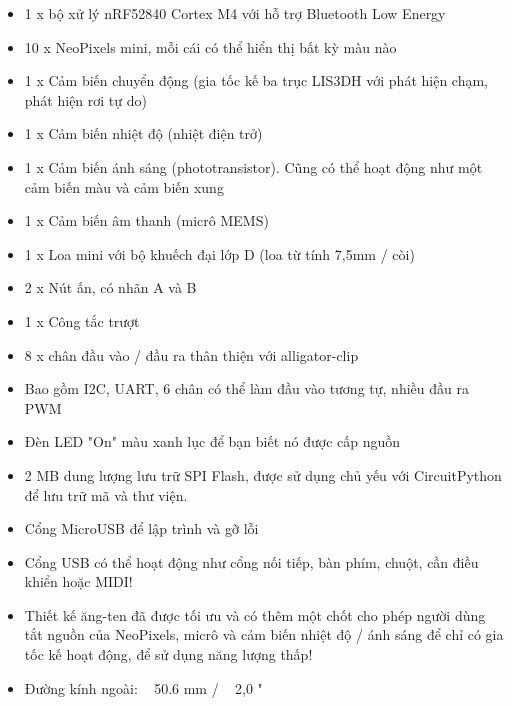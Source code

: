 \begin{itemize}
    \item 1 x bộ xử lý nRF52840 Cortex M4 với hỗ trợ Bluetooth Low Energy
    \item 10 x NeoPixels mini, mỗi cái có thể hiển thị bất kỳ màu nào
    \item 1 x Cảm biến chuyển động (gia tốc kế ba trục LIS3DH với phát hiện chạm, phát hiện rơi tự do)
    \item 1 x Cảm biến nhiệt độ (nhiệt điện trở)
    \item 1 x Cảm biến ánh sáng (phototransistor). Cũng có thể hoạt động như một cảm biến màu và cảm biến xung
    \item 1 x Cảm biến âm thanh (micrô MEMS)
    \item 1 x Loa mini với bộ khuếch đại lớp D (loa từ tính 7,5mm / còi)
    \item 2 x Nút ấn, có nhãn A và B
    \item 1 x Công tắc trượt
    \item 8 x chân đầu vào / đầu ra thân thiện với alligator-clip
    \item Bao gồm I2C, UART, 6 chân có thể làm đầu vào tương tự, nhiều đầu ra PWM
    \item Đèn LED "On" màu xanh lục để bạn biết nó được cấp nguồn
    \item 2 MB dung lượng lưu trữ SPI Flash, được sử dụng chủ yếu với CircuitPython để lưu trữ mã và thư viện.
    \item Cổng MicroUSB để lập trình và gỡ lỗi
    \item Cổng USB có thể hoạt động như cổng nối tiếp, bàn phím, chuột, cần điều khiển hoặc MIDI!
    \item Thiết kế ăng-ten đã được tối ưu và có thêm một chốt cho phép người dùng tắt nguồn của NeoPixels, micrô và cảm biến nhiệt độ / ánh sáng để chỉ có gia tốc kế hoạt động, để sử dụng năng lượng thấp!
    \item Đường kính ngoài: ~ 50.6 mm / ~ 2,0 "
    
    
\end{itemize}







